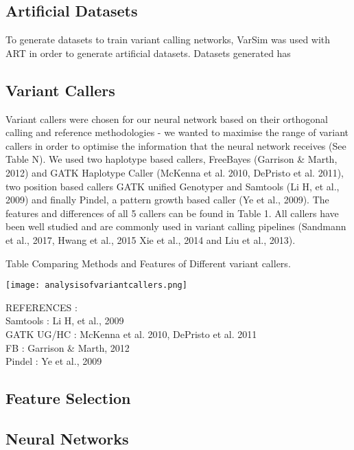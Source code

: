\documentclass{article}
\begin{document}
\subsection{Artificial Datasets}
To generate datasets to train variant calling networks, VarSim was used with ART in order to generate artificial datasets. Datasets generated has 


\subsection{Variant Callers}
Variant callers were chosen for our neural network based on their orthogonal calling and reference methodologies - we wanted to maximise the range of variant callers in order to optimise the information that the neural network receives (See Table N). We used two haplotype based callers, FreeBayes (Garrison \& Marth, 2012) and GATK Haplotype Caller (McKenna et al. 2010, DePristo et al. 2011), two position based callers GATK unified Genotyper and Samtools (Li H, et al., 2009) and finally Pindel, a pattern growth based caller (Ye et al., 2009). The features and differences of all 5 callers can be found in Table 1.  All callers have been well studied and are commonly used in variant calling pipelines (Sandmann et al., 2017, Hwang et al., 2015 Xie et al., 2014 and Liu et al., 2013). 

\begin{table}[h]
\caption{Table Comparing Methods and Features of Different variant callers.}
\texttt{[image: analysisofvariantcallers.png]}
\centering
\end{table}

REFERENCES : \\
Samtools : Li H, et al., 2009\\
GATK UG/HC : McKenna et al. 2010, DePristo et al. 2011\\
FB : Garrison \& Marth, 2012\\
Pindel : Ye et al., 2009\\

\subsection{Feature Selection}

\subsection{Neural Networks}
\end{document}
